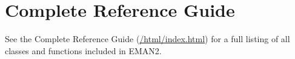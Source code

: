 \section{Complete Reference Guide}
  \label{Complete-Reference-Guide}

See the Complete Reference Guide
(\href{./html/index.html}{/html/index.html}) for a full listing of all
classes and functions included in EMAN2.